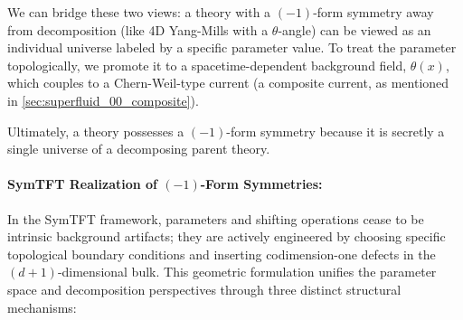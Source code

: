 \documentclass[aps,preprint,nofootinbib,preprintnumbers,eqsecnum,superscriptaddress]{revtex4}
\numberwithin{equation}{section}
\begin{document}
We can bridge these two views: a theory with a $(-1)$-form symmetry away from decomposition (like 4D Yang-Mills with a $\theta$-angle) can be viewed as an individual universe labeled by a specific parameter value. To treat the parameter topologically, we promote it to a spacetime-dependent background field, $\theta(x)$, which couples to a Chern-Weil-type current (a composite current, as mentioned in \ref{sec:superfluid_00_composite}). 

Ultimately, a theory possesses a $(-1)$-form symmetry because it is secretly a single universe of a decomposing parent theory. 

\paragraph{SymTFT Realization of $(-1)$-Form Symmetries:}

In the SymTFT framework, parameters and shifting operations cease to be intrinsic background artifacts; they are actively engineered by choosing specific topological boundary conditions and inserting codimension-one defects in the $(d+1)$-dimensional bulk. This geometric formulation unifies the parameter space and decomposition perspectives through three distinct structural mechanisms:
\end{document}
